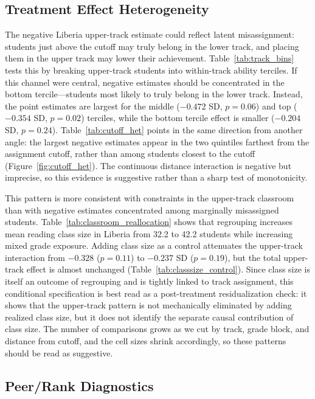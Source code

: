 \documentclass[11pt]{article}
\begin{document}
\subsection{Treatment Effect Heterogeneity}

The negative Liberia upper-track estimate could reflect latent misassignment: students just above the cutoff may truly belong in the lower track, and placing them in the upper track may lower their achievement. Table~\ref{tab:track_bins} tests this by breaking upper-track students into within-track ability terciles. If this channel were central, negative estimates should be concentrated in the bottom tercile---students most likely to truly belong in the lower track. Instead, the point estimates are largest for the middle ($-0.472$ SD, $p = 0.06$) and top ($-0.354$ SD, $p = 0.02$) terciles, while the bottom tercile effect is smaller ($-0.204$ SD, $p = 0.24$). Table~\ref{tab:cutoff_het} points in the same direction from another angle: the largest negative estimates appear in the two quintiles farthest from the assignment cutoff, rather than among students closest to the cutoff (Figure~\ref{fig:cutoff_het}). The continuous distance interaction is negative but imprecise, so this evidence is suggestive rather than a sharp test of monotonicity.

This pattern is more consistent with constraints in the upper-track classroom than with negative estimates concentrated among marginally misassigned students. Table~\ref{tab:classroom_reallocation} shows that regrouping increases mean reading class size in Liberia from 32.2 to 42.2 students while increasing mixed grade exposure. Adding class size as a control attenuates the upper-track interaction from $-0.328$ ($p = 0.11$) to $-0.237$ SD ($p = 0.19$), but the total upper-track effect is almost unchanged (Table~\ref{tab:classsize_control}). Since class size is itself an outcome of regrouping and is tightly linked to track assignment, this conditional specification is best read as a post-treatment residualization check: it shows that the upper-track pattern is not mechanically eliminated by adding realized class size, but it does not identify the separate causal contribution of class size. The number of comparisons grows as we cut by track, grade block, and distance from cutoff, and the cell sizes shrink accordingly, so these patterns should be read as suggestive.

\subsection{Peer/Rank Diagnostics}
\end{document}
